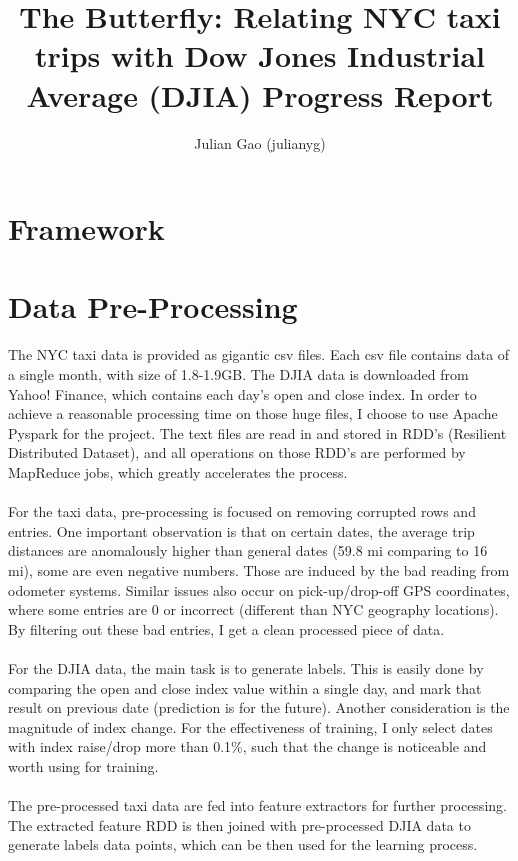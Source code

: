 \documentclass[a4paper]{article}
\title{The Butterfly: Relating NYC taxi trips with Dow Jones Industrial Average (DJIA) Progress Report}
\author{Julian Gao (julianyg)}
\begin{document}
\maketitle
\section{Framework}

\section{Data Pre-Processing}
The NYC taxi data is provided as gigantic csv files. Each csv file contains data of a single month, with size of 1.8-1.9GB. The DJIA data is downloaded from Yahoo! Finance, which contains each day's  open and close index. In order to achieve a reasonable processing time on those huge files, I choose to use Apache Pyspark for the project. The text files are read in and stored in RDD's (Resilient Distributed Dataset), and all operations on those RDD's are performed by MapReduce jobs, which greatly accelerates the process.\\ \\
For the taxi data, pre-processing is focused on removing corrupted rows and entries. One important observation is that on certain dates, the average trip distances are anomalously higher than general dates (59.8 mi comparing to 16 mi), some are even negative numbers. Those are induced by the bad reading from odometer systems. Similar issues also occur on pick-up/drop-off GPS coordinates, where some entries are 0 or incorrect (different than NYC geography locations). By filtering out these bad entries, I get a clean processed piece of data.\\ \\
For the DJIA data, the main task is to generate labels. This is easily done by comparing the open and close index value within a single day, and mark that result on previous date (prediction is for the future). Another consideration is the magnitude of index change. For the effectiveness of training, I only select dates with index raise/drop more than 0.1\%, such that the change is noticeable and worth using for training.\\\\
The pre-processed taxi data are fed into feature extractors for further 
processing. The extracted feature RDD is then joined with pre-processed DJIA data to generate labels data points, which can be then used for the learning process. 
\end{document}
